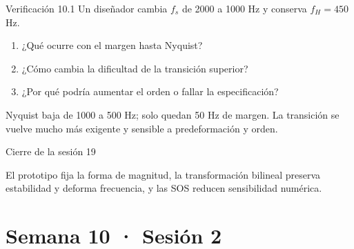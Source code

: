 \documentclass[
  ignorenonframetext,
  aspectratio=169,
  spanish,
  professionalfonts]{beamer}
\providecommand{\tightlist}{%
  \setlength{\itemsep}{0pt}\setlength{\parskip}{0pt}}
\begin{document}
\begin{frame}{Verificación 10.1}
\protect{}\label{verificaciuxf3n-10.1}
Un diseñador cambia \(f_s\) de 2000 a 1000 Hz y conserva \(f_H=450\) Hz.

\begin{enumerate}
\tightlist
\item
  ¿Qué ocurre con el margen hasta Nyquist?
\item
  ¿Cómo cambia la dificultad de la transición superior?
\item
  ¿Por qué podría aumentar el orden o fallar la especificación?
\end{enumerate}

\begin{tcolorbox}[enhanced jigsaw, arc=.35mm, bottomrule=.15mm, bottomtitle=1mm, breakable, colback=white, colbacktitle=quarto-callout-note-color!10!white, colframe=quarto-callout-note-color-frame, coltitle=black, left=2mm, leftrule=.75mm, opacityback=0, opacitybacktitle=0.6, rightrule=.15mm, title={Respuesta esperada}, titlerule=0mm, toprule=.15mm, toptitle=1mm]

Nyquist baja de 1000 a 500 Hz; solo quedan 50 Hz de margen. La
transición se vuelve mucho más exigente y sensible a predeformación y
orden.

\end{tcolorbox}
\end{frame}

\begin{frame}{Cierre de la sesión 19}
\protect{}\label{cierre-de-la-sesiuxf3n-19}
\begin{tcolorbox}[enhanced jigsaw, arc=.35mm, bottomrule=.15mm, bottomtitle=1mm, breakable, colback=white, colbacktitle=quarto-callout-important-color!10!white, colframe=quarto-callout-important-color-frame, coltitle=black, left=2mm, leftrule=.75mm, opacityback=0, opacitybacktitle=0.6, rightrule=.15mm, title={Síntesis}, titlerule=0mm, toprule=.15mm, toptitle=1mm]

El prototipo fija la forma de magnitud, la transformación bilineal
preserva estabilidad y deforma frecuencia, y las SOS reducen
sensibilidad numérica.

\end{tcolorbox}
\end{frame}

\section{Semana 10 · Sesión 2}\label{semana-10-sesiuxf3n-2}
\end{document}

